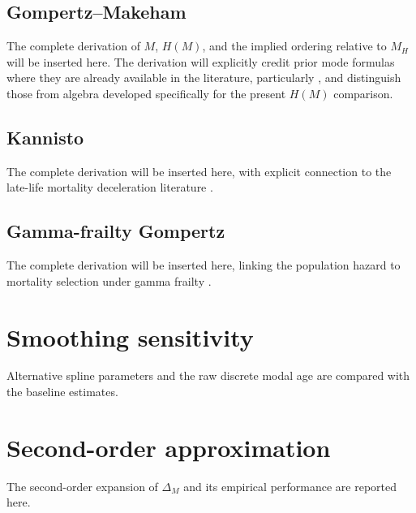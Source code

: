 \documentclass[doublespace]{interact}
\begin{document}
\subsection{Gompertz--Makeham}
The complete derivation of $M$, $H(M)$, and the implied ordering relative to $M_H$ will be inserted here. The derivation will explicitly credit prior mode formulas where they are already available in the literature, particularly \citet{HoriuchiEtAl2013}, and distinguish those from algebra developed specifically for the present $H(M)$ comparison.

\subsection{Kannisto}
The complete derivation will be inserted here, with explicit connection to the late-life mortality deceleration literature \citep{ThatcherKannistoVaupel1998}.

\subsection{Gamma-frailty Gompertz}
The complete derivation will be inserted here, linking the population hazard to mortality selection under gamma frailty \citep{VaupelMantonStallard1979,VaupelYashin1985,Missov2013}.

\section{Smoothing sensitivity}
Alternative spline parameters and the raw discrete modal age are compared with the baseline estimates.

\section{Second-order approximation}
The second-order expansion of $\Delta_M$ and its empirical performance are reported here.
\end{document}
